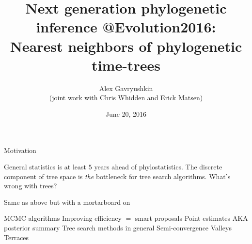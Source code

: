 \documentclass{beamer}
\title[\url{https://gavruskin.github.io/talks/2016_Evolution.pdf}]{Next generation phylogenetic inference @Evolution2016:\\
Nearest neighbors of phylogenetic time-trees}
\author[Alex Gavryushkin \hspace{80pt} These slides:]{Alex Gavryushkin\\
(joint work with Chris Whidden and Erick Matsen)}
\date{June 20, 2016}
\newcommand{\MCMC}{$\mathrm{MCMC}$ }
\theoremstyle{example}
\begin{document}
\begin{frame}[plain]
\titlepage
\end{frame}


\addtocounter{framenumber}{-1}


\begin{frame}{Motivation}
\begin{block}

\begin{outline}
\1 General statistics is at least $5$ years ahead of phylostatistics.
\pause
\1 The discrete component of tree space is \emph{the} bottleneck for tree search algorithms.
\pause
\1 What's wrong with trees?
\end{outline}
\end{block}

\pause

\begin{block}{Same as above but with a mortarboard on}
\begin{outline}
\1 \MCMC algorithms
	\2 Improving efficiency $=$ smart proposals
	\2 Point estimates AKA posterior summary
\1 Tree search methods in general
	\2 Semi-convergence
	\2 Valleys
	\2 Terraces
\end{outline}
\end{block}
\end{frame}
\end{document}
